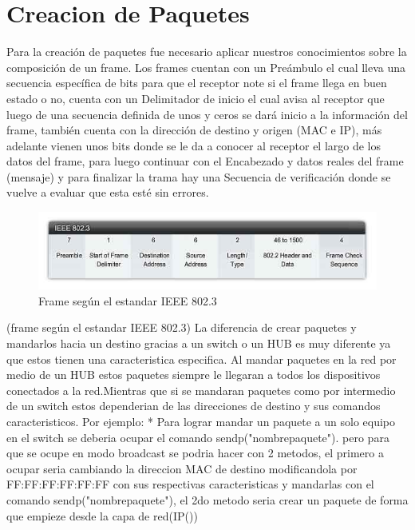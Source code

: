\documentclass{udpreport}
\begin{document}
	\section{Creacion de Paquetes}
		Para la creación de paquetes fue necesario aplicar nuestros conocimientos sobre la composición de un frame.
		Los frames cuentan con un Preámbulo el cual lleva una secuencia específica de bits para que el receptor note si el
		frame llega en buen estado o no, cuenta con un Delimitador de inicio el cual avisa al receptor que luego de una
		secuencia definida de unos y ceros se dará inicio a la información del frame, también cuenta con la dirección de
		destino y origen (MAC e IP), más adelante vienen unos bits donde se le da a conocer al receptor el largo de los datos
		del frame, para luego continuar con el Encabezado y datos reales del frame (mensaje) y para finalizar la trama hay una
		Secuencia de verificación donde se vuelve a evaluar que esta esté sin errores.\\
		\begin{figure}[H]
		    \centering
		    \includegraphics[width=\textwidth]{frame.jpg}
		    \caption{Frame según el estandar IEEE 802.3}
		\end{figure}
		(frame según el estandar IEEE 802.3)
		La diferencia de crear paquetes y mandarlos hacia un destino gracias a un 
		switch o un HUB es muy diferente ya que estos tienen una caracteristica 
		especifica. 
		Al mandar paquetes en la red por medio de un HUB estos paquetes siempre 
		le llegaran a todos los dispositivos conectados a la red.Mientras que si
		se mandaran paquetes como por intermedio de un switch estos dependerian de 
		las direcciones de destino  y sus comandos caracteristicos.
		Por ejemplo:  
		* Para lograr mandar un paquete a un solo equipo en el switch
		se deberia ocupar el comando sendp("nombrepaquete"). pero para que se ocupe 
		en modo broadcast se podria hacer con 2  metodos, el primero a ocupar seria
		cambiando la direccion MAC de destino modificandola por FF:FF:FF:FF:FF:FF con
		sus respectivas caracteristicas y mandarlas con el comando sendp("nombrepaquete"),
		el 2do metodo seria crear un paquete de forma que empieze desde la capa de red(IP())
\end{document}
